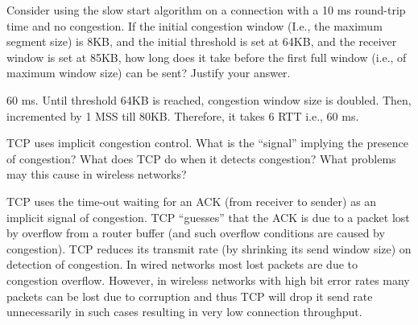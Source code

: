 \documentclass[answers,addpoints]{exam}
\begin{document}
\begin{questions}


\question
Consider using the slow start algorithm on a connection with a 10 ms round-trip time and no congestion. If the initial congestion window (I.e., the maximum segment size) is 8KB, and the initial threshold is set at 64KB, and the receiver window is set at 85KB, how long does it take before the first full window (i.e., of maximum window size) can be sent? Justify your answer. 
\fillwithdottedlines{1in}
\begin{solution} 
60 ms. Until threshold 64KB is reached, congestion window size is doubled. Then, incremented by 1 MSS till 80KB. Therefore, it takes 6 RTT i.e., 60 ms.
\end{solution}

\question
TCP uses implicit congestion control. What is the “signal” implying the presence of congestion? What does TCP do when it detects congestion? What problems may this cause in wireless networks?
\fillwithdottedlines{2in}
\begin{solution} 
TCP uses the time-out waiting for an ACK (from receiver to sender) as an implicit signal of congestion. TCP “guesses” that the ACK is due to a packet lost by overflow from a router buffer (and such overflow conditions are caused by congestion). TCP reduces its transmit rate (by shrinking its send window size) on detection of congestion. In wired networks most lost packets are due to congestion overflow. However, in wireless networks with high bit error rates many packets can be lost due to corruption and thus TCP will drop it send rate unnecessarily in such cases resulting in very low connection throughput.
\end{solution}


\end{questions}
\end{document}
